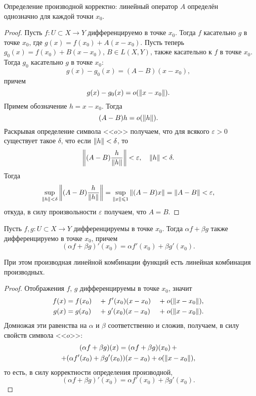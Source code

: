 \begin{theorem}
    Определение производной корректно: линейный оператор $A$ определён однозначно 
    для каждой точки $x_0$.
\end{theorem}

\begin{proof}
    Пусть $f \colon U \subset X \to Y$ дифференцируемо в точке $x_0$. Тогда
    $f$ касательно $g$ в точке $x_0$, где $g(x) = f(x_0) + A(x - x_0)$.
    Пусть теперь $g_0(x) = f(x_0) + B(x-x_0)$, $B \in L(X, Y)$,
     также касательно к $f$ в точке $x_0$.
    Тогда $g_0$ касательно $g$ в точке $x_0$:
    \[ g(x) - g_0(x) = (A-B)(x - x_0), \]
    причем
    \[ g(x) - g_0(x) = o(\left\|x - x_0\right\|). \]
    Примем обозначение $h = x - x_0$. Тогда
    \[ (A - B)h = o(\left\|h\right\|). \]
    Раскрывая определение символа <<$o$>> получаем, что для всякого $\varepsilon > 0$
    существует такое $\delta$, что если $\left\|h\right\| < \delta$, то 
    \[ \left\|(A-B)\frac{h}{\left\|h\right\|}\right\| < \varepsilon, \quad \left\|h\right\| < \delta. \]
    Тогда
    \[ \sup_{\left\|h\right\| < \delta} \left\|(A-B)\frac{h}{\left\|h\right\|}\right\| 
        = \sup_{\left\|x\right\| \leqslant 1} \left\|(A-B)x\right\| = \left\|A-B\right\| < \varepsilon, \]
    откуда, в силу произвольности $\varepsilon$ получаем, что $A = B$.
\end{proof}

\begin{theorem}
    Пусть $f, g \colon U \subset X \to Y$ дифференцируемы в точке $x_0$. Тогда
    $\alpha f + \beta g$ также дифференцируемо в точке $x_0$, причем
    \[ (\alpha f + \beta g)'(x_0) = \alpha f'(x_0) + \beta g'(x_0). \]

    При этом производная линейной комбинации функций есть линейная комбинация производных.
\end{theorem}

\begin{proof}
    Отображения $f$, $g$ дифференцируемы в точке $x_0$, значит
    \begin{alignat*}{6}
        f(x) &= f(x_0) \; &+& \; f'(x_0)(x - x_0) \; &+& \; o(\left\|x-x_0\right\|), \\
        g(x) &= g(x_0) \; &+& \; g'(x_0)(x - x_0) \; &+& \; o(\left\|x-x_0\right\|).
    \end{alignat*}
    Домножая эти равенства на $\alpha$ и $\beta$ соответственно и сложив, получаем, в силу
    свойств символа <<$o$>>:
    \begin{multline*}
        (\alpha f + \beta g)(x) = (\alpha f + \beta g)(x_0) \, + \\ +
            (\alpha f'(x_0) + \beta g'(x_0))(x - x_0) + o(\left\|x-x_0\right\|),
    \end{multline*}
    то есть, в силу корректности определения производной,
    \[ (\alpha f + \beta g)'(x_0) = \alpha f'(x_0) + \beta g'(x_0). \]
\end{proof}

